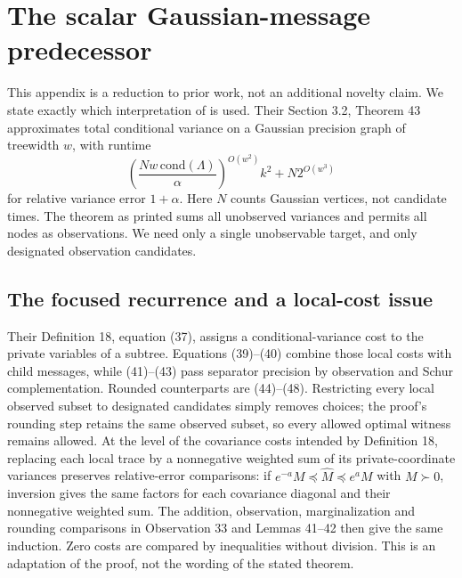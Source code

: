 \section{The scalar Gaussian-message predecessor}
\label{app:scalar-prior}
This appendix is a reduction to prior work, not an additional novelty claim.
We state exactly which interpretation of \citet{Mahalanabis2012} is used.
Their Section 3.2, Theorem 43 approximates total conditional variance on a
Gaussian precision graph of treewidth $w$, with runtime
\begin{equation}
 \left(\frac{Nw\,\mathrm{cond}(\Lambda)}{\alpha}\right)^{O(w^2)}k^2
       +N2^{O(w^3)}
 \label{eq:gmrf-runtime}
\end{equation}
for relative variance error $1+\alpha$. Here $N$ counts Gaussian vertices,
not candidate times. The theorem as printed sums all unobserved variances
and permits all nodes as observations. We need only a single unobservable
target, and only designated observation candidates.

\subsection{The focused recurrence and a local-cost issue}
Their Definition 18, equation (37), assigns a conditional-variance cost to
the private variables of a subtree. Equations (39)--(40) combine those local
costs with child messages, while (41)--(43) pass separator precision by
observation and Schur complementation. Rounded counterparts are (44)--(48).
Restricting every local observed subset to designated candidates simply
removes choices; the proof's rounding step retains the same observed subset,
so every allowed optimal witness remains allowed. At the level of the covariance costs intended by Definition 18, replacing
each local trace by a nonnegative weighted sum of its private-coordinate variances
preserves relative-error comparisons: if
$e^{-a}M\preceq\widehat M\preceq e^aM$ with $M\succ0$, inversion gives
the same factors for each covariance diagonal and their nonnegative weighted
sum. The addition, observation, marginalization and rounding comparisons in
Observation 33 and Lemmas 41--42 then give the same induction. Zero costs
are compared by inequalities without division. This is an adaptation of the
proof, not the wording of the stated theorem.


